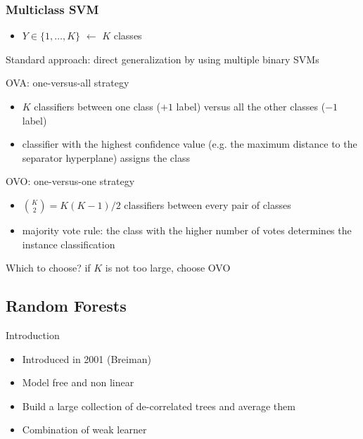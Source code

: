 \begin{frame}
  \frametitle{Multiclass SVM}
  \begin{itemize}
   \item $Y \in \{1,\ldots,K\}$ $\leftarrow$ $K$ classes
  \end{itemize}
   Standard approach: direct generalization by using multiple binary SVMs
   \begin{block}{OVA: one-versus-all strategy}
    \begin{itemize}
    \item $K$ classifiers between one class ($+1$ label) versus all the other classes ($-1$ label)
    \item[\doigt]  classifier with the highest confidence value (e.g. the maximum distance to the separator hyperplane) assigns the class
    \end{itemize}
   \end{block}


    \begin{block}{OVO: one-versus-one strategy}
    \begin{itemize}
    \item ${K \choose 2} =  K(K-1)/2$ classifiers between every pair of classes
    \item[\doigt] majority vote rule: the class with the higher number of votes determines the instance classification
    \end{itemize}
   \end{block}

   Which to choose? if $K$ is not too large, choose OVO

  \end{frame}


  \subsection{Random Forests}
  \begin{frame}{Introduction}
    \begin{itemize}
    \item Introduced in 2001 (Breiman)
    \item Model free and non linear
    \item Build a large collection of de-correlated trees and average them
    \item Combination of weak learner
    \end{itemize}
  \end{frame}

